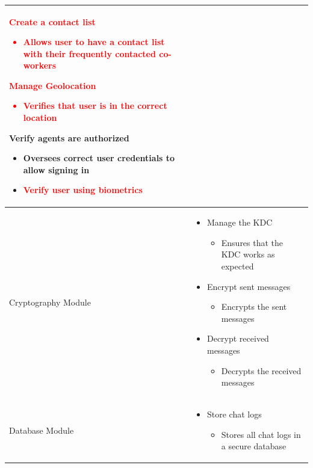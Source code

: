 \documentclass[]{article}
\begin{document}
\begin{center}
\begin{tabular}{| p{4cm} | p{13cm} |}
\begin{itemize}
\begin{itemize}
			      \end{itemize}
			\item[\textcolor{red}{•}] \textcolor{red}{Create a contact list
				\begin{itemize}
					\item Allows user to have a contact list with their frequently contacted co-workers
				\end{itemize}
			\item Manage Geolocation
			      \begin{itemize}
				      \item Verifies that user is in the correct location
			      \end{itemize}
			      }
			\item Verify agents are authorized
			      \begin{itemize}
				      \item Oversees correct user credentials to allow signing in
				      \item[\textcolor{red}{–}] \textcolor{red}{Verify user using biometrics}
			      \end{itemize}
		\end{itemize}  \\
		\hline
		Cryptography Module       &
		\begin{itemize}
			\item Manage the KDC
			      \begin{itemize}
				      \item Ensures that the KDC works as expected
			      \end{itemize}
			\item Encrypt sent messages
			      \begin{itemize}
				      \item Encrypts the sent messages
			      \end{itemize}
			\item Decrypt received messages
			      \begin{itemize}
				      \item Decrypts the received messages
			      \end{itemize}
		\end{itemize}                                  \\
		\hline
		Database Module           &
		\begin{itemize}
			\item Store chat logs
			      \begin{itemize}
				      \item Stores all chat logs in a secure database
			      \end{itemize}
		\end{itemize}                                   \\
		\hline
	\end{tabular}


\end{center}
\end{document}
